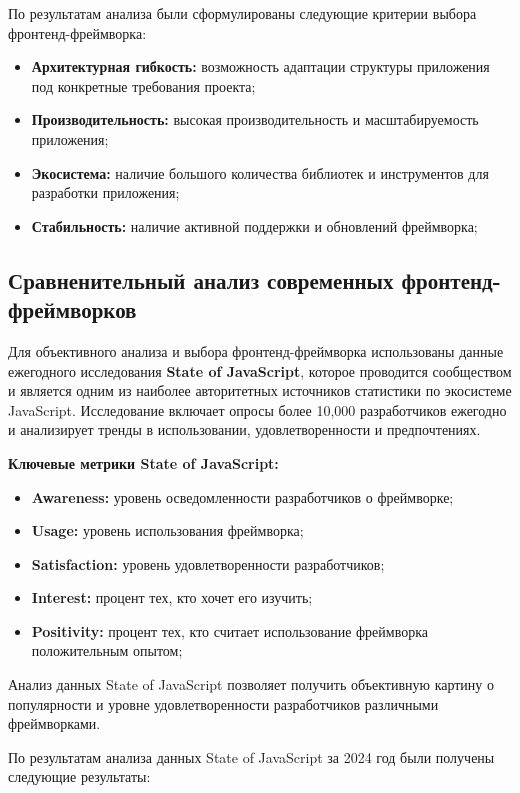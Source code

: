 По результатам анализа были сформулированы следующие критерии выбора фронтенд-фреймворка:

\begin{itemize}
	\item \textbf{Архитектурная гибкость:} возможность адаптации структуры приложения под конкретные требования проекта;
	\item \textbf{Производительность:} высокая производительность и масштабируемость приложения;
	\item \textbf{Экосистема:} наличие большого количества библиотек и инструментов для разработки приложения;
	\item \textbf{Стабильность:} наличие активной поддержки и обновлений фреймворка;
\end{itemize}

\subsection{Сравненительный анализ современных фронтенд-фреймворков}
Для объективного анализа и выбора фронтенд-фреймворка использованы данные ежегодного 
исследования \textbf{State of JavaScript}, которое проводится сообществом и является
одним из наиболее авторитетных источников статистики по экосистеме JavaScript. Исследование
включает опросы более 10,000 разработчиков ежегодно и анализирует тренды в использовании,
удовлетворенности и предпочтениях.

\textbf{Ключевые метрики State of JavaScript:}
\begin{itemize}
	\item \textbf{Awareness:} уровень осведомленности разработчиков о фреймворке;
	\item \textbf{Usage:} уровень использования фреймворка;
	\item \textbf{Satisfaction:} уровень удовлетворенности разработчиков;
	\item \textbf{Interest:} процент тех, кто хочет его изучить;
	\item \textbf{Positivity:} процент тех, кто считает использование фреймворка положительным опытом;
\end{itemize}

Анализ данных State of JavaScript позволяет получить объективную картину о популярности и 
уровне удовлетворенности разработчиков различными фреймворками.

По результатам анализа данных State of JavaScript за 2024 год были получены следующие результаты:

